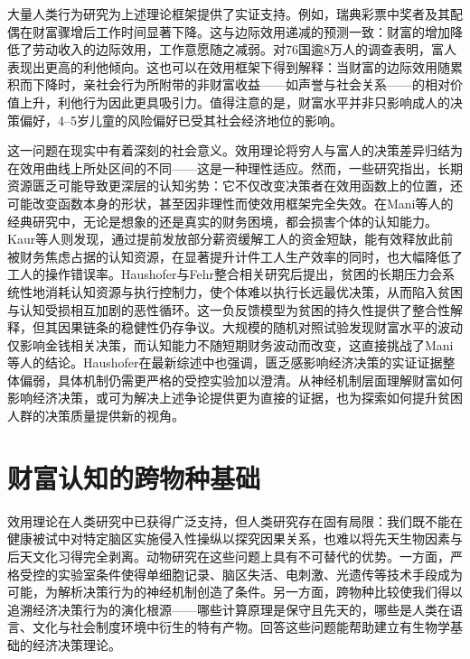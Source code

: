 大量人类行为研究为上述理论框架提供了实证支持。例如，瑞典彩票中奖者及其配偶在财富骤增后工作时间显著下降\cite{cesarini2017effect}。这与边际效用递减的预测一致：财富的增加降低了劳动收入的边际效用，工作意愿随之减弱。对76国逾8万人的调查表明，富人表现出更高的利他倾向\cite{vanags2025greater}。这也可以在效用框架下得到解释：当财富的边际效用随累积而下降时，亲社会行为所附带的非财富收益——如声誉与社会关系——的相对价值上升，利他行为因此更具吸引力。值得注意的是，财富水平并非只影响成人的决策偏好，4--5岁儿童的风险偏好已受其社会经济地位的影响\cite{harvey2022developmental}。

这一问题在现实中有着深刻的社会意义。效用理论将穷人与富人的决策差异归结为在效用曲线上所处区间的不同——这是一种理性适应。然而，一些研究指出，长期资源匮乏可能导致更深层的认知劣势：它不仅改变决策者在效用函数上的位置，还可能改变函数本身的形状，甚至因非理性而使效用框架完全失效。在Mani等人的经典研究中，无论是想象的还是真实的财务困境，都会损害个体的认知能力\cite{mani2013poverty}。Kaur等人则发现，通过提前发放部分薪资缓解工人的资金短缺，能有效释放此前被财务焦虑占据的认知资源，在显著提升计件工人生产效率的同时，也大幅降低了工人的操作错误率\cite{kaur2025financial}。Haushofer与Fehr整合相关研究后提出，贫困的长期压力会系统性地消耗认知资源与执行控制力，使个体难以执行长远最优决策，从而陷入贫困与认知受损相互加剧的恶性循环\cite{haushofer2014psychology}。这一负反馈模型为贫困的持久性提供了整合性解释，但其因果链条的稳健性仍存争议。大规模的随机对照试验发现财富水平的波动仅影响金钱相关决策，而认知能力不随短期财务波动而改变\cite{carvalho2016poverty}，这直接挑战了Mani等人的结论。Haushofer在最新综述中也强调，匮乏感影响经济决策的实证证据整体偏弱，具体机制仍需更严格的受控实验加以澄清\cite{haushofer2023psychology}。从神经机制层面理解财富如何影响经济决策，或可为解决上述争论提供更为直接的证据，也为探索如何提升贫困人群的决策质量提供新的视角。

\section{财富认知的跨物种基础}\label{chap1:animal_BHV}
效用理论在人类研究中已获得广泛支持，但人类研究存在固有局限：我们既不能在健康被试中对特定脑区实施侵入性操纵以探究因果关系，也难以将先天生物因素与后天文化习得完全剥离。动物研究在这些问题上具有不可替代的优势。一方面，严格受控的实验室条件使得单细胞记录、脑区失活、电刺激、光遗传等技术手段成为可能，为解析决策行为的神经机制创造了条件。另一方面，跨物种比较使我们得以追溯经济决策行为的演化根源——哪些计算原理是保守且先天的，哪些是人类在语言、文化与社会制度环境中衍生的特有产物。回答这些问题能帮助建立有生物学基础的经济决策理论。

